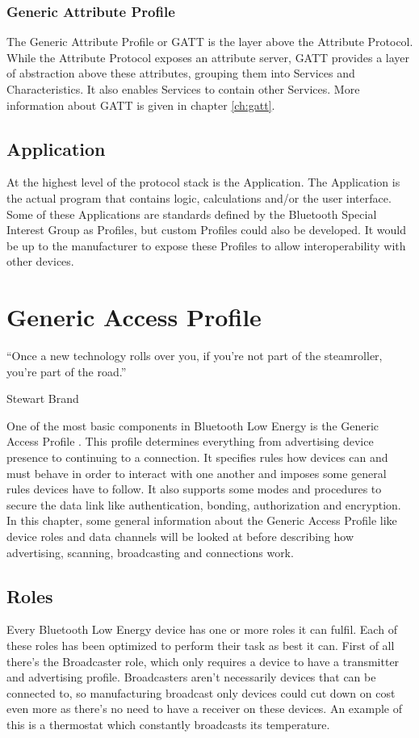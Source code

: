\documentclass[pdftex,a4paper,12pt,twoside]{report}
\begin{document}
\subsection{Generic Attribute Profile}
\label{subsec:hostGATT}
The Generic Attribute Profile or GATT is the layer above the Attribute Protocol. While the Attribute Protocol exposes an attribute server, GATT provides a layer of abstraction above these attributes, grouping them into Services and Characteristics. It also enables Services to contain other Services. More information about GATT is given in chapter \ref{ch:gatt}.

\section{Application}
\label{sec:stackApplication}
At the highest level of the protocol stack is the Application. The Application is the actual program that contains logic, calculations and/or the user interface. Some of these Applications are standards defined by the Bluetooth Special Interest Group as Profiles, but custom Profiles could also be developed. It would be up to the manufacturer to expose these Profiles to allow interoperability with other devices.

\chapter{Generic Access Profile}
\label{ch:gap}
\epigraph{``Once a new technology rolls over you, if you’re not part of the steamroller, you’re part of the road.''}{Stewart Brand}
One of the most basic components in Bluetooth Low Energy is the Generic Access Profile \citep{heydon2012bluetooth}. This profile determines everything from advertising device presence to continuing to a connection. It specifies rules how devices can and must behave in order to interact with one another and imposes some general rules devices have to follow. It also supports some modes and procedures to secure the data link like authentication, bonding, authorization and encryption. In this chapter, some general information about the Generic Access Profile like device roles and data channels will be looked at before describing how advertising, scanning, broadcasting and connections work.

\newpage{}

\section{Roles}
\label{sec:roles}
Every Bluetooth Low Energy device has one or more roles it can fulfil. Each of these roles has been optimized to perform their task as best it can. First of all there's the Broadcaster role, which only requires a device to have a transmitter and advertising profile. Broadcasters aren't necessarily devices that can be connected to, so manufacturing broadcast only devices could cut down on cost even more as there's no need to have a receiver on these devices. An example of this is a thermostat which constantly broadcasts its temperature.
\end{document}
